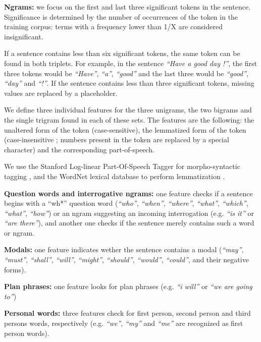 \textbf{Ngrams:} we focus on the first and last three significant tokens in the sentence. Significance is determined by the number of occurrences of the token in the training corpus: terms with a frequency lower than  1/X are considered insignificant. 

If a sentence contains less than six significant tokens, the same token can be found in both triplets. For example, in the sentence \textit{``Have a good day !''}, the first three tokens would be \textit{``Have''}, \textit{``a''}, \textit{``good''} and the last three would be \textit{``good''}, \textit{``day''} and \textit{``!''}. If the sentence contains less than three significant tokens, missing values are replaced by a placeholder.

We define three individual features for the three unigrams, the two bigrams and the single trigram found in each of these sets. The features are the following: the unaltered form of the token (case-sensitive), the lemmatized form of the token (case-insensitive ; numbers present in the token are replaced by a special character) and the corresponding part-of-speech.

We use the Stanford Log-linear Part-Of-Speech Tagger for morpho-syntactic tagging \cite{toutanova2003feature}, and the WordNet lexical database to perform lemmatization \cite{miller1995wordnet}.

\textbf{Question words and interrogative ngrams:} one feature checks if a sentence begins with a ``wh*'' question word  (\textit{``who''}, \textit{``when''}, \textit{``where''}, \textit{``what''}, \textit{``which''}, \textit{``what''}, \textit{``how''}) or an ngram suggesting an incoming interrogation (e.g. \textit{``is it''} or \textit{``are there''}), and another one checks if the sentence merely contains such a word or ngram.

\textbf{Modals:} one feature indicates wether the sentence contains a modal (\textit{``may''}, \textit{``must''}, \textit{``shall''}, \textit{``will''}, \textit{``might''}, \textit{``should''}, \textit{``would''}, \textit{``could''}, and their negative forms).

\textbf{Plan phrases:} one feature looks for plan phrases (e.g. \textit{``i will''} or \textit{``we are going to''})

\textbf{Personal words:} three features check for first person, second person and third persons words, respectively (e.g. \textit{``we''}, \textit{``my''} and \textit{``me''} are recognized as first person words).


